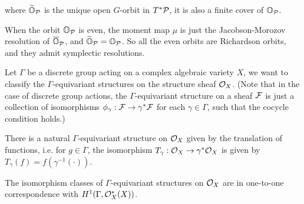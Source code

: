 where $\widetilde{\mathbb{O}}_{\mathcal{P}}$ is the unique open $G$-orbit in $T^*\mathcal{P}$, it is also a finite cover of $\mathbb{O}_{\mathcal{P}}$.

When the orbit $\mathbb{O}_{\mathcal{P}}$ is even, the moment map $\mu$ is just the Jacobson-Morozov resolution of $\overline{\mathbb{O}}_{\mathcal{P}}$, and $\widetilde{\mathbb{O}}_{\mathcal{P}} = \mathbb{O}_{\mathcal{P}}$. So all the even orbits are Richardson orbits, and they admit symplectic resolutions.




Let $\Gamma$ be a discrete group acting on a complex algebraic variety $X$, we want to classify the $\Gamma$-equivariant structures on the structure sheaf $\mathcal{O}_X$. (Note that in the case of discrete group actions, the $\Gamma$-equivariant structure on a sheaf $\mathcal{F}$ is just a collection of isomorphisms $\phi_{\gamma}: \mathcal{F} \to {\gamma}^* \mathcal{F}$ for each $\gamma \in \Gamma$, such that the cocycle condition holds.\cite{Achar21})

\begin{lem}
  There is a natural $\Gamma$-equivariant structure on $\mathcal{O}_X$ given by the translation of functions, i.e. for $g \in \Gamma$, the isomorphism $T_{\gamma}:  \mathcal{O}_X \to {\gamma}^* \mathcal{O}_X$ is given by $T_{\gamma}(f) = f(\gamma^{-1}(\cdot)) $.
\end{lem}

\begin{thm}
  The isomorphism classes of $\Gamma$-equivariant structures on $\mathcal{O}_X$ are in one-to-one correspondence with $H^1(\Gamma, \mathcal{O}^{*}_X(X))$.
\end{thm}

